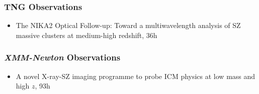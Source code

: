 \subsubsection{TNG Observations}
\begin{itemize}[leftmargin=20pt]
    \item The NIKA2 Optical Follow-up: Toward a multiwavelength analysis of SZ massive clusters at medium-high redshift, 36h
\end{itemize}
\vspace{-3pt}

\subsubsection{\textit{XMM-Newton} Observations}
\begin{itemize}[leftmargin=20pt]
    \item A novel X-ray-SZ imaging programme to probe ICM physics at low mass and high $z$, 93h
\end{itemize}
